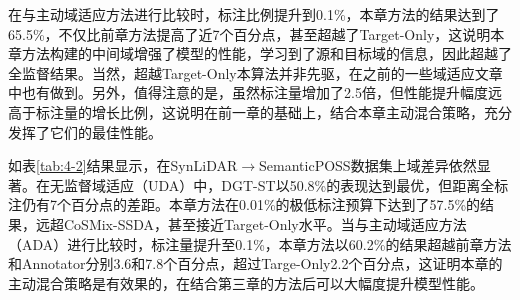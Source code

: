     在与主动域适应方法进行比较时，标注比例提升到0.1\%，本章方法的结果达到了65.5\%，不仅比前章方法提高了近7个百分点，甚至超越了Target-Only，这说明本章方法构建的中间域增强了模型的性能，学习到了源和目标域的信息，因此超越了全监督结果。当然，超越Target-Only本算法并非先驱，在之前的一些域适应文章中也有做到。另外，值得注意的是，虽然标注量增加了2.5倍，但性能提升幅度远高于标注量的增长比例，这说明在前一章的基础上，结合本章主动混合策略，充分发挥了它们的最佳性能。
    
    
    如表\ref{tab:4-2}结果显示，在SynLiDAR$\to$SemanticPOSS数据集上域差异依然显著。在无监督域适应（UDA）中，DGT-ST以50.8\%的表现达到最优，但距离全标注仍有7个百分点的差距。本章方法在0.01\%的极低标注预算下达到了57.5\%的结果，远超CoSMix-SSDA，甚至接近Target-Only水平。当与主动域适应方法（ADA）进行比较时，标注量提升至0.1\%，本章方法以60.2\%的结果超越前章方法和Annotator分别3.6和7.8个百分点，超过Targe-Only2.2个百分点，这证明本章的主动混合策略是有效果的，在结合第三章的方法后可以大幅度提升模型性能。

